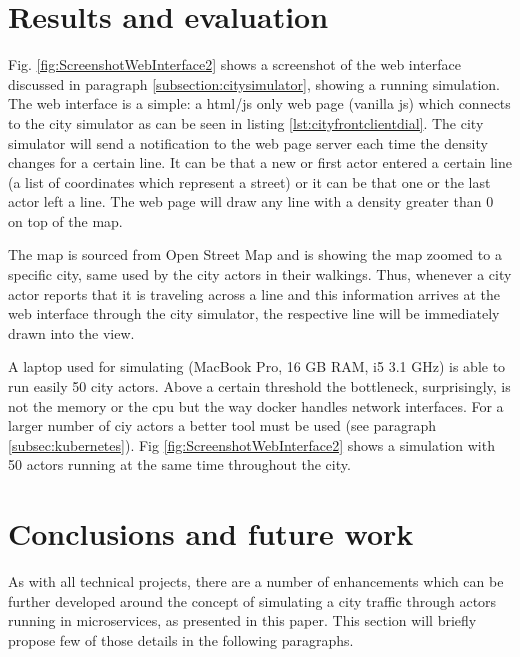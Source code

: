 \documentclass[conference]{IEEEtran}
\begin{document}
\section{Results and evaluation}
\label{sec:results}

Fig. \ref{fig:ScreenshotWebInterface2} shows a screenshot of the web interface discussed in paragraph \ref{subsection:citysimulator}, showing a running simulation. The web interface is a simple: a html/js only web page (vanilla js) which connects to the city simulator as can be seen in listing \ref{lst:cityfrontclientdial}. The city simulator will send a notification to the web page server each time the density changes for a certain line. It can be that a new or first actor entered a certain line (a list of coordinates which represent a street) or it can be that one or the last actor left a line. The web page will draw any line with a density greater than 0 on top of the map.

The map is sourced from Open Street Map \cite{openstreetmap} and is showing the map zoomed to a specific city, same used by the city actors in their walkings. Thus, whenever a city actor reports that it is traveling across a line and this information arrives at the web interface through the city simulator, the respective line will be immediately drawn into the view.

A laptop used for simulating (MacBook Pro, 16 GB RAM, i5 3.1 GHz) is able to run easily 50 city actors. Above a certain threshold the bottleneck, surprisingly, is not the memory or the cpu but the way docker handles network interfaces. For a larger number of ciy actors a better tool must be used (see paragraph \ref{subsec:kubernetes}). Fig \ref{fig:ScreenshotWebInterface2} shows a simulation with 50 actors running at the same time throughout the city.

\balance

\section{Conclusions and future work}
\label{sec:enhancements}

As with all technical projects, there are a number of enhancements which can be further developed around the concept of simulating a city traffic through actors running in microservices, as presented in this paper. This section will briefly propose few of those details in the following paragraphs.
\end{document}
